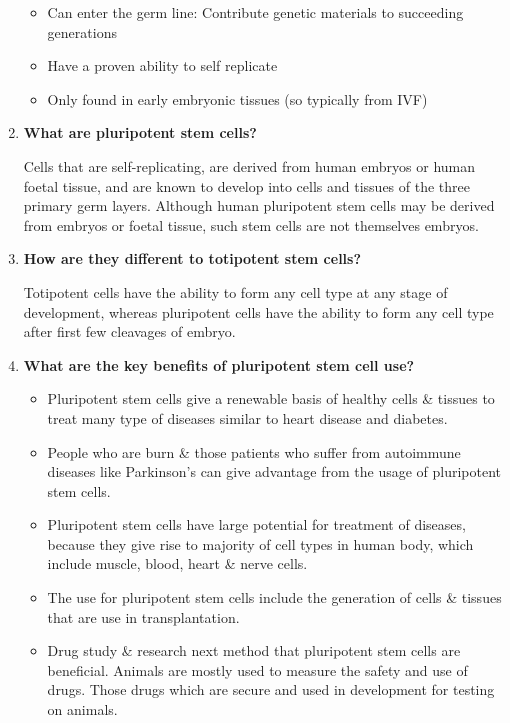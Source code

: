 \documentclass[a4paper]{article}
\begin{document}
\begin{enumerate}
\begin{itemize}
	\item Can enter the germ line: Contribute genetic materials to succeeding generations
	\item Have a proven ability to self replicate
	\item Only found in early embryonic tissues (so typically from IVF)
\end{itemize}


    \item \textbf{What are pluripotent stem cells? \cite{William}}
    
    Cells that are self-replicating, are derived from human embryos or human foetal tissue, and are known to develop into cells and tissues of the three primary germ layers. Although human pluripotent stem cells may be derived from embryos or foetal tissue, such stem cells are not themselves embryos.


    \item \textbf{How are they different to totipotent stem cells? \cite{DifferenceBetween}}

Totipotent cells have the ability to form any cell type at any stage of development, whereas pluripotent cells have the ability to form any cell type after first few cleavages of embryo.

    \item \textbf{What are the key benefits of pluripotent stem cell use? \cite{ukessays.com2018}}

\begin{itemize}
	\item Pluripotent stem cells give a renewable basis of healthy cells \& tissues to treat many type of diseases similar to heart disease and diabetes.
	\item People who are burn \& those patients who suffer from autoimmune diseases like Parkinson’s can give advantage from the usage of pluripotent stem cells.
	\item Pluripotent stem cells have large potential for treatment of diseases, because they give rise to majority of cell types in human body, which include muscle, blood, heart \& nerve cells.
	\item The use for pluripotent stem cells include the generation of cells \& tissues that are use in transplantation.
	\item Drug study \& research next method that pluripotent stem cells are beneficial. Animals are mostly used to measure the safety and use of drugs. Those drugs which are secure and used in development for testing on animals.
\end{itemize}


\end{enumerate}
\end{document}
